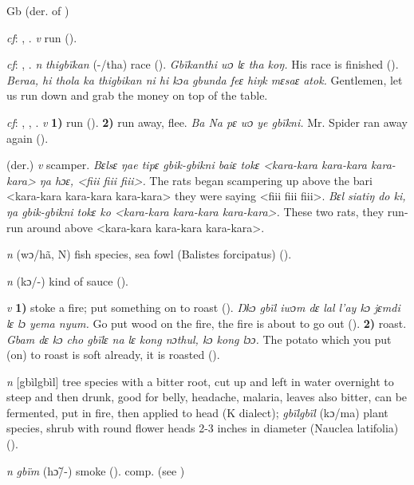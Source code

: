 \begin{letter}{Gb}
 (der. of ) 

 \textit{cf}: , . \textit{v} run (\citealt{Sumner1921}). 

 \textit{cf}: , . \textit{n} \textit{thigbïkan} (-/tha) race (\citealt{Pichl1967}). \textit{Gbïkanthi wɔ lɛ tha koŋ.} His race is finished (\citealt{Pichl1967}). \textit{Beraa, hi thola ka thigbikan ni hi kɔa gbunda feɛ hiŋk mɛsaɛ atok.} Gentlemen, let us run down and grab the money on top of the table. 

 \textit{cf}: , , . \textit{v} \textbf{1)} run (\citealt{Pichl1967}). \textbf{2)} run away, flee. \textit{Ba Na pɛ wɔ ye gbïkni.} Mr. Spider ran away again (\citealt{Pichl1967}).

 (der.) \textit{v} scamper. \textit{Bɛlsɛ ŋae tipɛ gbik-gbikni baiɛ tokɛ <kara-kara kara-kara kara-kara> ŋa hɔɛ, <fiii fiii fiii>.} The rats began scampering up above the bari <kara-kara kara-kara kara-kara> they were saying <fiii fiii fiii>. \textit{Bɛl siatiŋ do ki, ŋa gbik-gbikni tokɛ ko <kara-kara kara-kara kara-kara>.} These two rats, they run-run around above <kara-kara kara-kara kara-kara>.

 \textit{n} (wɔ/hã, N) fish species, sea fowl (Balistes forcipatus) (\citealt{Pichl1967}). 

 \textit{n} (kɔ/-) kind of sauce (\citealt{Pichl1967}). 

 \textit{v} \textbf{1)} stoke a fire; put something on to roast (\citealt{Pichl1967}). \textit{Ŋkɔ gbïl iwɔm dɛ lal l'ay kɔ jɛmdi lɛ lɔ yema nyum.} Go put wood on the fire, the fire is about to go out (\citealt{Pichl1967}). \textbf{2)} roast. \textit{Gbam dɛ kɔ cho gbïlɛ na lɛ kong nɔthul, kɔ kong lɔɔ.} The potato which you put (on) to roast is soft already, it is roasted (\citealt{Pichl1967}).

 \textit{n} [gbìlgbìl] tree species with a bitter root, cut up and left in water overnight to steep and then drunk, good for belly, headache, malaria, leaves also bitter, can be fermented, put in fire, then applied to head (K dialect); \textit{gbïlgbïl} (kɔ/ma) plant species, shrub with round flower heads 2-3 inches in diameter (Nauclea latifolia) (\citealt{Pichl1967}).

 \textit{n} \textit{gbïm} (hɔ̃/-) smoke (\citealt{Pichl1967}). comp.  (see ) 


\end{letter}
